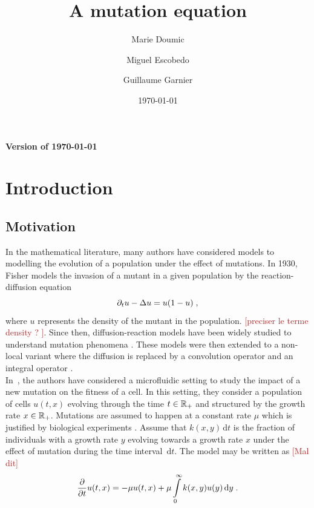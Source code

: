 \documentclass[11pt]{amsart}
\title{A mutation equation}
\author{Marie Doumic \and Miguel Escobedo \and Guillaume Garnier}
\date{\today}
\newcommand{\f}{\frac}
\newcommand{\diff}{\,\mathrm{d}}
\newcommand{\ndr}[1]{\textcolor{brown}{[#1]}}
\begin{document}
\maketitle
\begin{center}
    \textbf{Version of \today}
\end{center}

\tableofcontents

\section{Introduction}

\subsection{Motivation} \mbox{}

In the mathematical literature, many authors have considered models to modelling the evolution of a population under the effect of mutations. In 1930, Fisher models the invasion of a mutant in a given population by the reaction-diffusion equation
    \begin{equation*}
        \partial_t u - \Delta u = u(1-u)
        \; ,
    \end{equation*} 
where $u$ represents the density of the mutant in the population. \ndr{preciser le terme density ? }. 
Since then, diffusion-reaction models have been widely studied to understand mutation phenomena \cite{alfaro2017replicator,alfaro2017superexponential}. 
These models were then extended to a non-local variant where the diffusion is replaced by a convolution operator \cite{coville2007non} and an integral operator \cite{burger1996stationary,bonnefon2015concentration}. \\

In~\cite{robert2018mutation}, the authors have considered a microfluidic setting to study the impact of a new mutation on the fitness of a cell. 
In this setting, they consider a population of cells $u(t,x)$ evolving through the time $t \in \mathbb{R}_+$ and structured by the growth rate $x \in \mathbb{R}_+$. Mutations are assumed to happen at a constant rate $\mu$ which is justified by biological experiments \cite{robert2018mutation}.  Assume that $k(x,y)\diff t$ is the fraction of individuals with a growth rate $y$ evolving towards a growth rate $x$ under the effect of mutation during the time interval $\diff t$. The model may be written as \ndr{Mal dit}
    \begin{equation}
    \f{\partial}{\partial t} u(t,x) = - \mu u(t,x) + \mu \int\limits_0^\infty k(x,y) u(y) \diff y 
    \eqfinp
    \label{eq:lydia}
    \end{equation}
\end{document}
